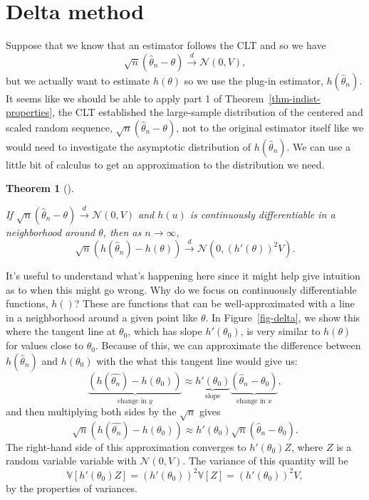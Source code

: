 \documentclass[
  letterpaper,
  DIV=11,
  numbers=noendperiod]{scrreprt}
\newcommand{\V}{\mathbb{V}}
\newcommand{\N}{\mathcal{N}}
\newcommand{\indist}{\overset{d}{\to}}
\theoremstyle{definition}
\theoremstyle{plain}
\newtheorem{theorem}{Theorem}[chapter]
\theoremstyle{definition}
\theoremstyle{remark}
\begin{document}
\hypertarget{delta-method}{%
\section{Delta method}\label{delta-method}}

Suppose that we know that an estimator follows the CLT and so we have \[
\sqrt{n}\left(\widehat{\theta}_n - \theta  \right) \indist \N(0, V),
\] but we actually want to estimate \(h(\theta)\) so we use the plug-in
estimator, \(h(\widehat{\theta}_n)\). It seems like we should be able to
apply part 1 of Theorem~\ref{thm-indist-properties}, the CLT established
the large-sample distribution of the centered and scaled random
sequence, \(\sqrt{n}(\widehat{\theta}_n - \theta)\), not to the original
estimator itself like we would need to investigate the asymptotic
distribution of \(h(\widehat{\theta}_n)\). We can use a little bit of
calculus to get an approximation to the distribution we need.

\leavevmode{}%
\begin{theorem}[]\label{thm-delta-method}

If \(\sqrt{n}\left(\widehat{\theta}_n - \theta\right) \indist \N(0, V)\)
and \(h(u)\) is continuously differentiable in a neighborhood around
\(\theta\), then as \(n\to\infty\), \[
\sqrt{n}\left(h(\widehat{\theta}_n) - h(\theta)  \right) \indist \N(0, (h'(\theta))^2 V).
\]

\end{theorem}

It's useful to understand what's happening here since it might help give
intuition as to when this might go wrong. Why do we focus on
continuously differentiable functions, \(h()\)? These are functions that
can be well-approximated with a line in a neighborhood around a given
point like \(\theta\). In Figure~\ref{fig-delta}, we show this where the
tangent line at \(\theta_0\), which has slope \(h'(\theta_0)\), is very
similar to \(h(\theta)\) for values close to \(\theta_0\). Because of
this, we can approximate the difference between
\(h(\widehat{\theta}_n)\) and \(h(\theta_0)\) with the what this tangent
line would give us: \[
\underbrace{\left(h(\widehat{\theta_n}) - h(\theta_0)\right)}_{\text{change in } y} \approx \underbrace{h'(\theta_0)}_{\text{slope}} \underbrace{\left(\widehat{\theta}_n - \theta_0\right)}_{\text{change in } x},
\] and then multiplying both sides by the \(\sqrt{n}\) gives \[
\sqrt{n}\left(h(\widehat{\theta_n}) - h(\theta_0)\right) \approx h'(\theta_0)\sqrt{n}\left(\widehat{\theta}_n - \theta_0\right). 
\] The right-hand side of this approximation converges to
\(h'(\theta_0)Z\), where \(Z\) is a random variable variable with
\(\N(0, V)\). The variance of this quantity will be \[
\V[h'(\theta_0)Z] = (h'(\theta_0))^2\V[Z] = (h'(\theta_0))^2V,
\] by the properties of variances.
\end{document}
